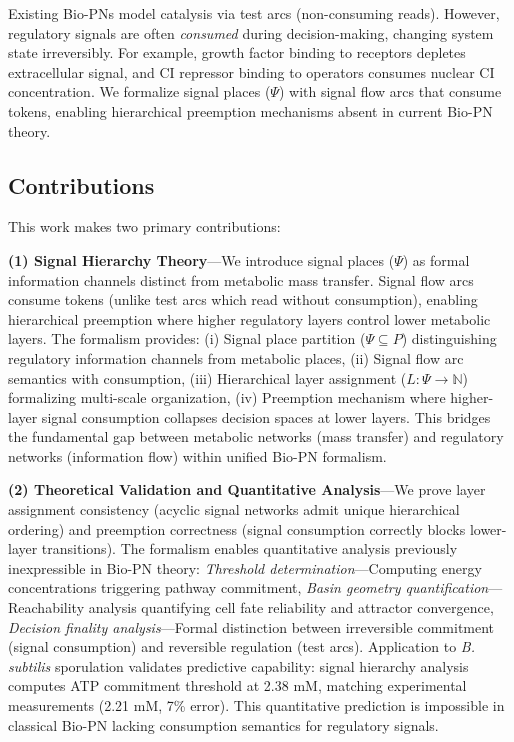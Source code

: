\noindent 
Existing Bio-PNs model catalysis via test arcs (non-consuming reads). However, regulatory signals are often \textit{consumed} during decision-making, changing system state irreversibly. For example, growth factor binding to receptors depletes extracellular signal, and CI repressor binding to operators consumes nuclear CI concentration. We formalize signal places ($\Psi$) with signal flow arcs that consume tokens, enabling hierarchical preemption mechanisms absent in current Bio-PN theory.

\subsection{Contributions}

This work makes two primary contributions:

\noindent\textbf{(1) Signal Hierarchy Theory}---We introduce signal places ($\Psi$) as formal information channels distinct from metabolic mass transfer. Signal flow arcs consume tokens (unlike test arcs which read without consumption), enabling hierarchical preemption where higher regulatory layers control lower metabolic layers. The formalism provides: (i) Signal place partition ($\Psi \subseteq P$) distinguishing regulatory information channels from metabolic places, (ii) Signal flow arc semantics with consumption, (iii) Hierarchical layer assignment ($L: \Psi \to \mathbb{N}$) formalizing multi-scale organization, (iv) Preemption mechanism where higher-layer signal consumption collapses decision spaces at lower layers. This bridges the fundamental gap between metabolic networks (mass transfer) and regulatory networks (information flow) within unified Bio-PN formalism.

\noindent\textbf{(2) Theoretical Validation and Quantitative Analysis}---We prove layer assignment consistency (acyclic signal networks admit unique hierarchical ordering) and preemption correctness (signal consumption correctly blocks lower-layer transitions). The formalism enables quantitative analysis previously inexpressible in Bio-PN theory: \textit{Threshold determination}---Computing energy concentrations triggering pathway commitment, \textit{Basin geometry quantification}---Reachability analysis quantifying cell fate reliability and attractor convergence, \textit{Decision finality analysis}---Formal distinction between irreversible commitment (signal consumption) and reversible regulation (test arcs). Application to \textit{B. subtilis} sporulation validates predictive capability: signal hierarchy analysis computes ATP commitment threshold at 2.38 mM, matching experimental measurements (2.21 mM, 7\% error). This quantitative prediction is impossible in classical Bio-PN lacking consumption semantics for regulatory signals.

